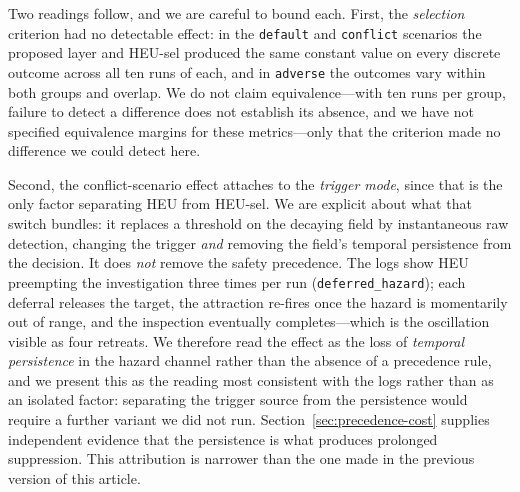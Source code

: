 Two readings follow, and we are careful to bound each. First, the \emph{selection}
criterion had no detectable effect: in the \texttt{default} and \texttt{conflict}
scenarios the proposed layer and HEU-sel produced the same constant value on every
discrete outcome across all ten runs of each, and in \texttt{adverse} the outcomes
vary within both groups and overlap. We do not claim equivalence---with ten runs per
group, failure to detect a difference does not establish its absence, and we have not
specified equivalence margins for these metrics---only that the criterion made no
difference we could detect here.

Second, the conflict-scenario effect attaches to the \emph{trigger mode}, since that
is the only factor separating HEU from HEU-sel. We are explicit about what that
switch bundles: it replaces a threshold on the decaying field by instantaneous raw
detection, changing the trigger \emph{and} removing the field's temporal persistence
from the decision. It does \emph{not} remove the safety precedence. The logs show HEU
preempting the investigation three times per run (\texttt{deferred\_hazard}); each
deferral releases the target, the attraction re-fires once the hazard is momentarily
out of range, and the inspection eventually completes---which is the oscillation
visible as four retreats. We therefore read the effect as the loss of \emph{temporal
persistence} in the hazard channel rather than the absence of a precedence rule, and
we present this as the reading most consistent with the logs rather than as an
isolated factor: separating the trigger source from the persistence would require a
further variant we did not run. Section~\ref{sec:precedence-cost} supplies independent
evidence that the persistence is what produces prolonged suppression. This attribution
is narrower than the one made in the previous version of this article.

